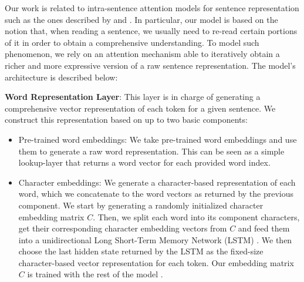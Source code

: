 \documentclass[11pt,letterpaper]{article}
\begin{document}
Our work is related to intra-sentence attention models for sentence representation such as the ones described by   and . In particular, our model is based on the notion that, when reading a sentence, we usually need to re-read certain portions of it in order to  obtain a comprehensive understanding. To model such phenomenon, we rely on an attention mechanism able to iteratively obtain a richer and more expressive version of a raw sentence representation. The model's architecture is described below:



\textbf{Word Representation Layer}: This layer is in charge of generating a comprehensive vector representation of each token for a given sentence. We construct this representation based on up to two basic components:

\begin{itemize}
\item Pre-trained word embeddings: We take pre-trained word embeddings and use them to generate a raw word representation. This can be seen as a simple lookup-layer that returns a word vector for each provided word index.

\item Character embeddings: We generate a character-based representation of each word, which we concatenate to the word vectors as returned by the previous component. We start by generating a randomly initialized character embedding matrix $C$. Then, we split each word into its component characters, get their corresponding character embedding vectors from $C$ and feed them into a unidirectional Long Short-Term Memory Network (LSTM) \cite{hochreiter1997long}. We then choose the last hidden state returned by the LSTM as the fixed-size character-based vector representation for each token. Our embedding matrix $C$ is trained with the rest of the model \cite{wang2017multiperspective}.


\end{itemize}
\end{document}
